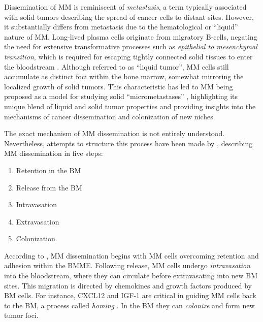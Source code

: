Dissemination of \ac{MM} is reminiscent of \emph{metastasis}, a
term typically associated with solid tumors describing the spread of cancer
cells to distant sites. However, it substantially differs from metastasis due to
the hematological or ``liquid'' nature of \ac{MM}. Long-lived plasma cells originate
from migratory B-cells, negating the need for extensive transformative processes
such as \emph{epithelial to mesenchymal transition}, which is required for
escaping tightly connected solid tissues to enter the bloodstream
\cite{ribattiEpithelialMesenchymalTransitionCancer2020}. Although referred to as
``liquid tumor'', \ac{MM} cells still accumulate as distinct foci within the bone
marrow, somewhat mirroring the localized growth of solid tumors. This
characteristic has led to \ac{MM} being proposed as a model for studying solid
``micrometastases'' \cite{ghobrialMyelomaModelProcess2012}, highlighting its
unique blend of liquid and solid tumor properties and providing insights into
the mechanisms of cancer dissemination and colonization of new niches.

The exact mechanism of \ac{MM} dissemination is not entirely understood.
Nevertheless, attempts to structure this process have been made by
\citet{zeissigTumourDisseminationMultiple2020}, describing \ac{MM} dissemination in
five steps:
\begin{enumerate}
    \item Retention in the \ac{BM}
    \item Release from the \ac{BM}
    \item Intravasation
    \item Extravasation
    \item Colonization.
\end{enumerate}


According to \citet{zeissigTumourDisseminationMultiple2020}, \ac{MM}
dissemination begins with \ac{MM} cells overcoming retention and adhesion within
the \ac{BMME}. Following release, \ac{MM} cells undergo \emph{intravasation}
into the bloodstream, where they can circulate before extravasating into new
\ac{BM} sites. This migration is directed by chemokines and growth factors
produced by \ac{BM} cells. For instance, CXCL12 and IGF-1 are critical in
guiding \ac{MM} cells back to the \ac{BM}, a process called \emph{homing}
\cite{vandebroekExtravasationHomingMechanisms2008}. In the \ac{BM} they can
\emph{colonize} and form new tumor foci.


